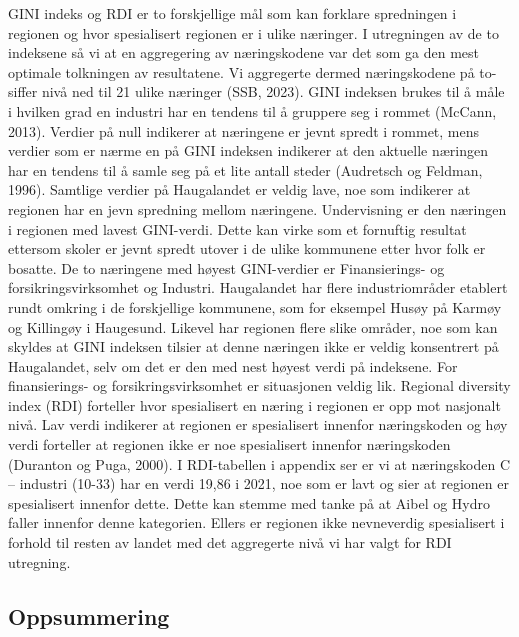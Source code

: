 \documentclass[
]{article}
\begin{document}
GINI indeks og RDI er to forskjellige mål som kan forklare spredningen i
regionen og hvor spesialisert regionen er i ulike næringer. I
utregningen av de to indeksene så vi at en aggregering av næringskodene
var det som ga den mest optimale tolkningen av resultatene. Vi
aggregerte dermed næringskodene på to-siffer nivå ned til 21 ulike
næringer (SSB, 2023). GINI indeksen brukes til å måle i hvilken grad en
industri har en tendens til å gruppere seg i rommet (McCann, 2013).
Verdier på null indikerer at næringene er jevnt spredt i rommet, mens
verdier som er nærme en på GINI indeksen indikerer at den aktuelle
næringen har en tendens til å samle seg på et lite antall steder
(Audretsch og Feldman, 1996). Samtlige verdier på Haugalandet er veldig
lave, noe som indikerer at regionen har en jevn spredning mellom
næringene. Undervisning er den næringen i regionen med lavest
GINI-verdi. Dette kan virke som et fornuftig resultat ettersom skoler er
jevnt spredt utover i de ulike kommunene etter hvor folk er bosatte. De
to næringene med høyest GINI-verdier er Finansierings- og
forsikringsvirksomhet og Industri. Haugalandet har flere industriområder
etablert rundt omkring i de forskjellige kommunene, som for eksempel
Husøy på Karmøy og Killingøy i Haugesund. Likevel har regionen flere
slike områder, noe som kan skyldes at GINI indeksen tilsier at denne
næringen ikke er veldig konsentrert på Haugalandet, selv om det er den
med nest høyest verdi på indeksene. For finansierings- og
forsikringsvirksomhet er situasjonen veldig lik. Regional diversity
index (RDI) forteller hvor spesialisert en næring i regionen er opp mot
nasjonalt nivå. Lav verdi indikerer at regionen er spesialisert innenfor
næringskoden og høy verdi forteller at regionen ikke er noe spesialisert
innenfor næringskoden (Duranton og Puga, 2000). I RDI-tabellen i
appendix ser er vi at næringskoden C -- industri (10-33) har en verdi
19,86 i 2021, noe som er lavt og sier at regionen er spesialisert
innenfor dette. Dette kan stemme med tanke på at Aibel og Hydro faller
innenfor denne kategorien. Ellers er regionen ikke nevneverdig
spesialisert i forhold til resten av landet med det aggregerte nivå vi
har valgt for RDI utregning.

\hypertarget{oppsummering}{%
\subsection{Oppsummering}\label{oppsummering}}
\end{document}
